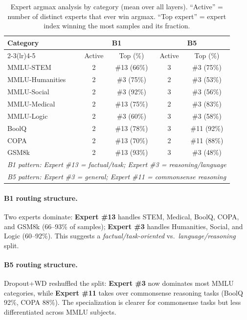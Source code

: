 \documentclass[11pt,a4paper]{article}
\begin{document}
\begin{table}[ht]
\centering
\caption{Expert argmax analysis by category (mean over all layers).
  ``Active'' = number of distinct experts that ever win argmax.
  ``Top expert'' = expert index winning the most samples and its fraction.}
\label{tab:specialization}
\begin{tabular}{lcccc}
\toprule
Category & \multicolumn{2}{c}{B1} & \multicolumn{2}{c}{B5} \\
\cmidrule(lr){2-3}\cmidrule(lr){4-5}
 & Active & Top (\%) & Active & Top (\%) \\
\midrule
MMLU-STEM       & 2 & \#13 (66\%) & 3 & \#3 (75\%) \\
MMLU-Humanities & 2 & \#3  (75\%) & 2 & \#3 (53\%) \\
MMLU-Social     & 2 & \#3  (92\%) & 3 & \#3 (56\%) \\
MMLU-Medical    & 2 & \#13 (75\%) & 2 & \#3 (83\%) \\
MMLU-Logic      & 2 & \#3  (60\%) & 3 & \#3 (58\%) \\
BoolQ           & 2 & \#13 (78\%) & 3 & \#11 (92\%) \\
COPA            & 2 & \#13 (70\%) & 2 & \#11 (88\%) \\
GSM8k           & 2 & \#13 (93\%) & 3 & \#3  (48\%) \\
\midrule
\multicolumn{5}{l}{\textit{B1 pattern: Expert \#13 = factual/task; Expert \#3 = reasoning/language}} \\
\multicolumn{5}{l}{\textit{B5 pattern: Expert \#3 = general; Expert \#11 = commonsense reasoning}} \\
\bottomrule
\end{tabular}
\end{table}

\paragraph{B1 routing structure.}
Two experts dominate: \textbf{Expert \#13} handles STEM, Medical, BoolQ, COPA,
and GSM8k (66--93\% of samples); \textbf{Expert \#3} handles Humanities, Social,
and Logic (60--92\%).  This suggests a \emph{factual/task-oriented} vs.\
\emph{language/reasoning} split.

\paragraph{B5 routing structure.}
Dropout+WD reshuffled the split: \textbf{Expert \#3} now dominates most MMLU
categories, while \textbf{Expert \#11} takes over commonsense reasoning tasks
(BoolQ 92\%, COPA 88\%).  The specialization is clearer for commonsense tasks
but less differentiated across MMLU subjects.
\end{document}
